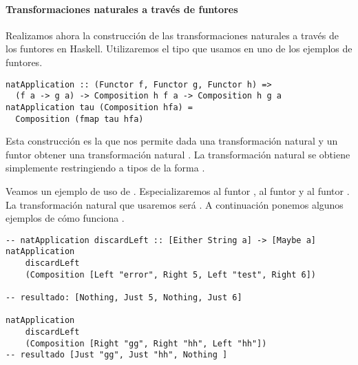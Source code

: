 \paragraph{Transformaciones naturales a través de funtores}
Realizamos ahora la construcción de las transformaciones naturales
a través de los funtores en Haskell. Utilizaremos el tipo
 que usamos en uno de los ejemplos de
funtores.
\begin{verbatim}
natApplication :: (Functor f, Functor g, Functor h) =>
  (f a -> g a) -> Composition h f a -> Composition h g a
natApplication tau (Composition hfa) =
  Composition (fmap tau hfa)
\end{verbatim}
Esta construcción es la que nos permite dada una transformación
natural  y un funtor  obtener una transformación
natural .
La transformación natural  se obtiene simplemente
restringiendo  a tipos de la forma .

Veamos un ejemplo de uso de . Especializaremos
 al funtor ,  al funtor
 y  al funtor \cod{[]}. La transformación natural
que usaremos será .
A continuación ponemos algunos ejemplos de cómo funciona
.
\begin{verbatim}
-- natApplication discardLeft :: [Either String a] -> [Maybe a]
natApplication
    discardLeft
    (Composition [Left "error", Right 5, Left "test", Right 6])

-- resultado: [Nothing, Just 5, Nothing, Just 6]

natApplication
    discardLeft
    (Composition [Right "gg", Right "hh", Left "hh"])
-- resultado [Just "gg", Just "hh", Nothing ]
\end{verbatim}


